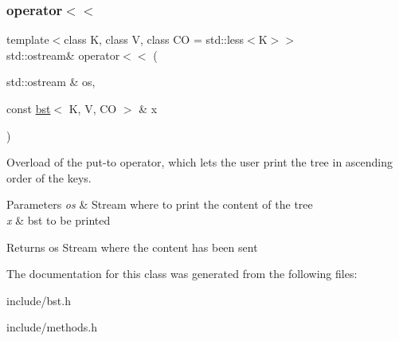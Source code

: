 \subsubsection{\texorpdfstring{operator$<$$<$}{operator<<}}
{\footnotesize\ttfamily template$<$class K, class V, class CO = std\+::less$<$\+K$>$$>$ \\
std\+::ostream\& operator$<$$<$ (\begin{DoxyParamCaption}\item[{std\+::ostream \&}]{os,  }\item[{const \hyperlink{classbst}{bst}$<$ K, V, CO $>$ \&}]{x }\end{DoxyParamCaption})\hspace{0.3cm}{\ttfamily [friend]}}



Overload of the put-\/to operator, which lets the user print the tree in ascending order of the keys. 


\begin{DoxyParams}{Parameters}
{\em os} & Stream where to print the content of the tree \\
\hline
{\em x} & bst to be printed \\
\hline
\end{DoxyParams}
\begin{DoxyReturn}{Returns}
os Stream where the content has been sent 
\end{DoxyReturn}


The documentation for this class was generated from the following files\+:\begin{DoxyCompactItemize}
\item 
include/bst.\+h\item 
include/methods.\+h\end{DoxyCompactItemize}
